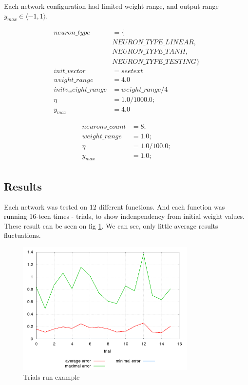 \documentclass[10pt,a5paper]{article}
\begin{document}
Each network configuration had limited weight range, and output range $y_{max} \in \langle -1, 1 \rangle$.

\begin{align}
\label{eq:nn_conditions}
neuron\_type &= \{ \nonumber \\
                &NEURON\_TYPE\_LINEAR, \nonumber \\
                &NEURON\_TYPE\_TANH, \nonumber \\
                &NEURON\_TYPE\_TESTING \} \nonumber \\
init\_vector &= {see text} \nonumber \\
weight\_range &= 4.0 \nonumber \\
initv_weight\_range &= weight\_range/4 \nonumber \\
\eta &= 1.0/1000.0; \nonumber \\
y_{max} &= 4.0
\end{align}


\begin{align}
\label{eq:knn_conditions}
neurons\_count &= 8; \nonumber \\
weight\_range &= 1.0; \nonumber \\
\eta &= 1.0/100.0; \nonumber \\
y_{max} &= 1.0; \nonumber \\
\end{align}

\newpage
\subsection{Results}

Each network was tested on 12 different functions. And each function was running
16-teen times - trials, to show indenpendency from initial weight values. These
result can be seen on fig \ref{img:NN Trials run example}. We can see, only little average
results fluctuations.

\begin{figure}[!ht]
\centering
\includegraphics[width=3.5in]{images/error_log.png}
\caption{Trials run example}
\label{img:NN Trials run example}
\end{figure}
\end{document}
